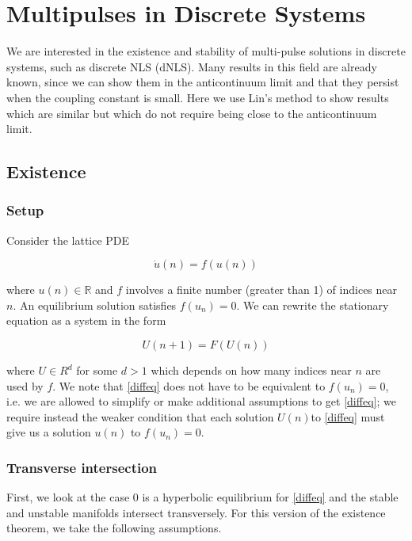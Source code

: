\documentclass[12pt]{article}
\def\R{{\mathbb R}}
\begin{document}
\section{Multipulses in Discrete Systems}

We are interested in the existence and stability of multi-pulse solutions in  discrete systems, such as discrete NLS (dNLS). Many results in this field are already known, since we can show them in the anticontinuum limit and that they persist when the coupling constant is small. Here we use Lin's method to show results which are similar but which do not require being close to the anticontinuum limit.

\subsection{Existence}

\subsubsection{Setup}

Consider the lattice PDE

\begin{equation}\label{latticePDE}
\dot{u}(n) = f(u(n))
\end{equation}

where $u(n) \in \R$ and $f$ involves a finite number (greater than 1) of indices near $n$. An equilibrium solution satisfies $f(u_n) = 0$. We can rewrite the stationary equation as a system in the form 

\begin{equation}\label{diffeq}
U(n+1) = F(U(n))
\end{equation}

where $U \in R^d$ for some $d > 1$ which depends on how many indices near $n$ are used by $f$. We note that \eqref{diffeq} does not have to be equivalent to $f(u_n) = 0$, i.e. we are allowed to simplify or make additional assumptions to get \eqref{diffeq}; we require instead the weaker condition that each solution $U(n)$to \eqref{diffeq} must give us a solution $u(n)$ to $f(u_n) = 0$.

\subsubsection{Transverse intersection}

First, we look at the case 0 is a hyperbolic equilibrium for \eqref{diffeq} and the stable and unstable manifolds intersect transversely. For this version of the existence theorem, we take the following assumptions.
\end{document}
